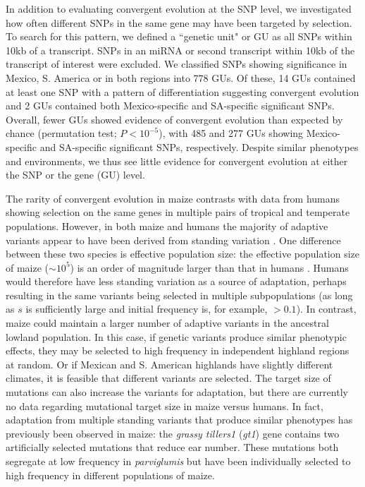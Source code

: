 {{In addition to evaluating convergent evolution at the SNP level, we investigated how often different SNPs in the same gene may have been targeted by selection. 
To search for this pattern, we defined a ``genetic unit" or GU as all SNPs within 10kb of a transcript.  
SNPs in an miRNA or second transcript within 10kb of the transcript of interest were excluded.  
We classified SNPs showing significance in Mexico, S. America or in both regions into 778 GUs. 
Of these, 14 GUs contained at least one SNP with a pattern of differentiation suggesting convergent evolution and 2 GUs contained both Mexico-specific and SA-specific significant SNPs. 
Overall, fewer GUs showed evidence of convergent evolution than expected by chance (permutation test; $P<10^{-5}$), with 485 and 277 GUs showing Mexico-specific and SA-specific significant SNPs, respectively.  
Despite similar phenotypes and environments, we thus see little evidence for convergent evolution at either the SNP or the gene (GU) level.  

The rarity of convergent evolution in maize contrasts with data from humans \citep{Tennessen_2011_21698142} showing selection on the same genes in multiple pairs of tropical and temperate populations.  
However, in both maize and humans the majority of adaptive variants appear to have been derived from standing variation \cite[]{Tennessen_2011_21698142}.
One difference between these two species is effective population size: the effective population size of maize ($\sim10^5$) is an order of magnitude larger than that in humans \cite[]{Takahata_1997_9114074}.
Humans would therefore have less standing variation as a source of adaptation, perhaps resulting in the same variants being selected in multiple subpopulations (as long as $s$ is sufficiently large and initial frequency is, for example, $>0.1$).
In contrast, maize could maintain a larger number of adaptive variants in the ancestral lowland population.
In this case, if genetic variants produce similar phenotypic effects, they may be selected to high frequency in independent highland regions at random.
Or if Mexican and S. American highlands have slightly different climates, it is feasible that different variants are selected.
The target size of mutations can also increase the variants for adaptation, but there are currently no data regarding mutational target size in maize versus humans.
 
In fact, adaptation from multiple standing variants that produce similar phenotypes has previously been observed in maize: the \emph{grassy tillers1} (\emph{gt1}) gene \cite[]{Wills_2013_23825971} contains two artificially selected mutations that reduce ear number.
These mutations both segregate at low frequency in \emph{parviglumis} but have been individually selected to high frequency in different populations of maize.

}}
